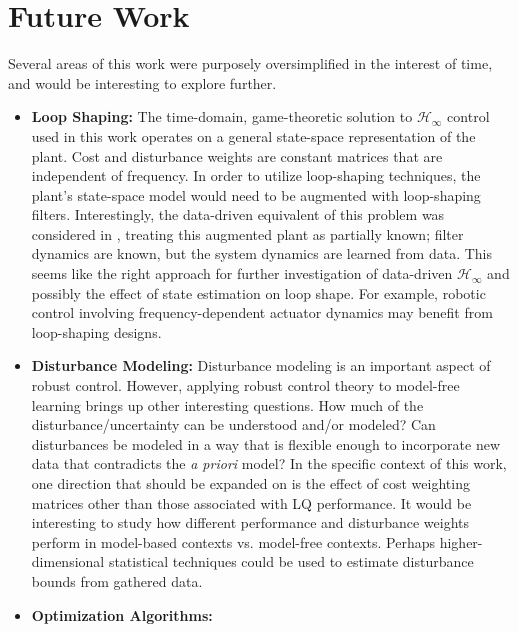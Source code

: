 \section{Future Work}
Several areas of this work were purposely oversimplified in the interest of time, and would be interesting to explore further.
\begin{itemize}
\item{\textbf{Loop Shaping:} The time-domain, game-theoretic solution to $\mathcal{H}_{\infty}$ control used in this work operates on a general state-space representation of the plant.  Cost and disturbance weights are constant matrices that are independent of frequency.  In order to utilize loop-shaping techniques, the plant's state-space model would need to be augmented with loop-shaping filters.  Interestingly, the data-driven equivalent of this problem was considered in \cite{berberich2022combining}, treating this augmented plant as partially known; filter dynamics are known, but the system dynamics are learned from data.  This seems like the right approach for further investigation of data-driven $\mathcal{H}_{\infty}$ and possibly the effect of state estimation on loop shape.  For example, robotic control involving frequency-dependent actuator dynamics may benefit from loop-shaping designs.
}
%
\item{\textbf{Disturbance Modeling:}
Disturbance modeling is an important aspect of robust control.  However, applying robust control theory to model-free learning brings up other interesting questions.  How much of the disturbance/uncertainty can be understood and/or modeled?  Can disturbances be modeled in a way that is flexible enough to incorporate new data that contradicts the \emph{a priori} model?  In the specific context of this work, one direction that should be expanded on is the effect of cost weighting matrices other than those associated with LQ performance.  It would be interesting to study how different performance and disturbance weights perform in model-based contexts vs. model-free contexts.  Perhaps higher-dimensional statistical techniques could be used to estimate disturbance bounds from gathered data.
}
%
\item{\textbf{Optimization Algorithms:}
}
\end{itemize}
